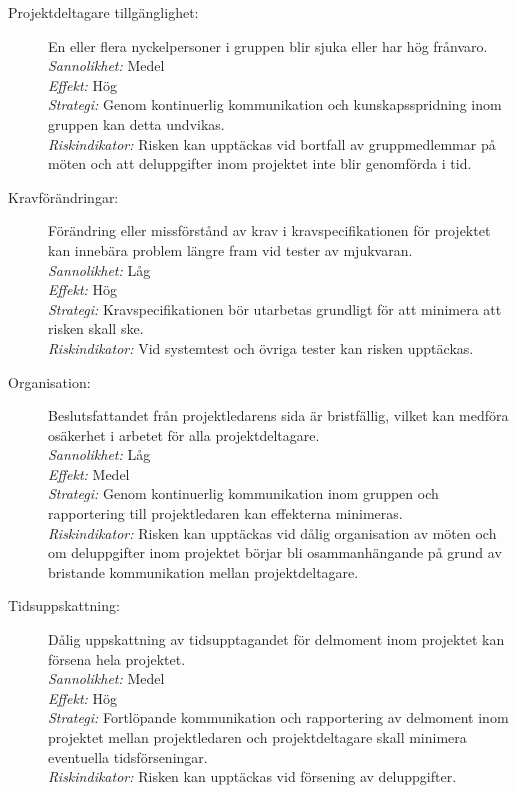 \documentclass[a4paper]{article}
\begin{document}
\begin{description}
\item[Projektdeltagare tillgänglighet:]
En eller flera nyckelpersoner i gruppen blir sjuka eller har hög frånvaro. \\
\emph{Sannolikhet:}
Medel \\
\emph{Effekt:}
Hög \\
\emph{Strategi:}
Genom kontinuerlig kommunikation och kunskapsspridning inom gruppen kan detta
undvikas. \\
\emph{Riskindikator:}
Risken kan upptäckas vid bortfall av gruppmedlemmar på möten och att 
deluppgifter inom projektet inte blir genomförda i tid.

\item[Kravförändringar:]
Förändring eller missförstånd av krav i kravspecifikationen för projektet kan
 innebära problem längre fram vid tester av mjukvaran. \\
\emph{Sannolikhet:}
Låg \\
\emph{Effekt:}
Hög \\
\emph{Strategi:}
Kravspecifikationen bör utarbetas grundligt för att minimera att risken skall
 ske. \\
\emph{Riskindikator:}
Vid systemtest och övriga tester kan risken upptäckas.

\item[Organisation:]
Beslutsfattandet från projektledarens sida är bristfällig, vilket kan medföra
 osäkerhet i arbetet för alla projektdeltagare. \\
\emph{Sannolikhet:}
Låg \\
\emph{Effekt:}
Medel \\
\emph{Strategi:}
Genom kontinuerlig kommunikation inom gruppen och rapportering till
 projektledaren kan effekterna minimeras. \\
\emph{Riskindikator:}
Risken kan upptäckas vid dålig organisation av möten och om deluppgifter inom
 projektet börjar bli osammanhängande på grund av bristande kommunikation
 mellan projektdeltagare.

\item[Tidsuppskattning:]
Dålig uppskattning av tidsupptagandet för delmoment inom projektet kan försena
 hela projektet. \\
\emph{Sannolikhet:}
Medel \\
\emph{Effekt:}
Hög \\
\emph{Strategi:}
Fortlöpande kommunikation och rapportering av delmoment inom projektet mellan
 projektledaren och projektdeltagare skall minimera eventuella
 tidsförseningar. \\
\emph{Riskindikator:}
Risken kan upptäckas vid försening av deluppgifter.


\end{description}
\end{document}
